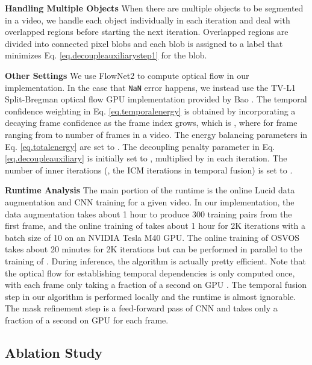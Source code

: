 \documentclass[10pt,twocolumn,letterpaper]{article}
\begin{document}
\noindent\textbf{Handling Multiple Objects} When there are multiple objects to be segmented in a video,
we handle each object individually in each iteration and deal with overlapped regions before starting the next iteration.
Overlapped regions are divided into connected pixel blobs and each blob is assigned to a label that minimizes Eq. \eqref{eq.decoupleauxiliarystep1} for the blob.

\noindent\textbf{Other Settings} We use FlowNet2 \cite{ilg2017flownet} to compute optical flow in our implementation.
In the case that \texttt{NaN} error happens, we instead use the TV-L1 Split-Bregman optical flow GPU implementation provided by Bao \etal \cite{bao2014comparison}.
The temporal confidence weighting  in Eq. \eqref{eq.temporalenergy} is obtained
by incorporating a decaying frame confidence as the frame index grows, which is ,
where  for frame  ranging from  to number of frames in a video.
The energy balancing parameters in Eq. \eqref{eq.totalenergy} are set to .
The decoupling penalty parameter in Eq. \eqref{eq.decoupleauxiliary} is initially set to , multiplied by  in each iteration.
The number of inner iterations (\ie, the ICM iterations in temporal fusion) is set to . 



\noindent\textbf{Runtime Analysis} The main portion of the runtime is the online Lucid data augmentation and CNN training for a given video.
In our implementation, the data augmentation takes about 1 hour to produce 300 training pairs from the first frame,
and the online training of  takes about 1 hour for 2K iterations with a batch size of 10 on an NVIDIA Tesla M40 GPU.
The online training of OSVOS takes about 20 minutes for 2K iterations but can be performed in parallel to the training of .
During inference, the algorithm is actually pretty efficient.
Note that the optical flow for establishing temporal dependencies is only computed once,
with each frame only taking a fraction of a second on GPU \cite{ilg2017flownet,bao2014comparison}.
The temporal fusion step in our algorithm is performed locally and the runtime is almost ignorable.
The mask refinement step is a feed-forward pass of CNN and takes only a fraction of a second on GPU for each frame.


\subsection{Ablation Study}
\end{document}
